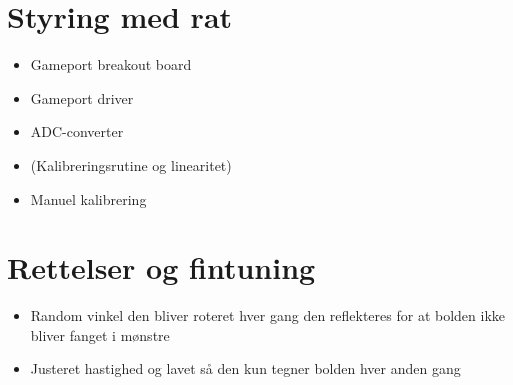 \section{Styring med rat}
\begin{itemize}
\item Gameport breakout board
\item Gameport driver
\item ADC-converter
\item (Kalibreringsrutine og linearitet)
\item Manuel kalibrering
\end{itemize}


\section{Rettelser og fintuning}
\begin{itemize}
\item Random vinkel den bliver roteret hver gang den reflekteres for at bolden ikke bliver fanget i mønstre
\item Justeret hastighed og lavet så den kun tegner bolden hver anden gang
\end{itemize}